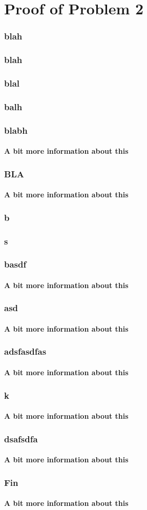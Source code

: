\documentclass{beamer}
\begin{document}
\section{Proof of Problem 2}
  \begin{frame}
    \frametitle{blah}
  \end{frame}
  \begin{frame}
    \frametitle{blah}
  \end{frame}
   \begin{frame}
    \frametitle{blal}
  \end{frame}
  \begin{frame}
    \frametitle{balh}
  \end{frame}
  \begin{frame}
    \frametitle{blabh}
    \framesubtitle{A bit more information about this}
  \end{frame}
  \begin{frame}
    \frametitle{BLA}
    \framesubtitle{A bit more information about this}
  \end{frame}
  \begin{frame}
    \frametitle{b}
  \end{frame}
  \begin{frame}
    \frametitle{s}
  \end{frame}
  \begin{frame}
    \frametitle{basdf}
    \framesubtitle{A bit more information about this}
  \end{frame}
  \begin{frame}
    \frametitle{asd}
    \framesubtitle{A bit more information about this}
  \end{frame}
  \begin{frame}
    \frametitle{adsfasdfas}
    \framesubtitle{A bit more information about this}
  \end{frame}
  \begin{frame}
    \frametitle{k}
    \framesubtitle{A bit more information about this}
  \end{frame}
  \begin{frame}
    \frametitle{dsafsdfa}
    \framesubtitle{A bit more information about this}
  \end{frame}
  \begin{frame}
    \frametitle{Fin}
    \framesubtitle{A bit more information about this}
  \end{frame}
\end{document}
